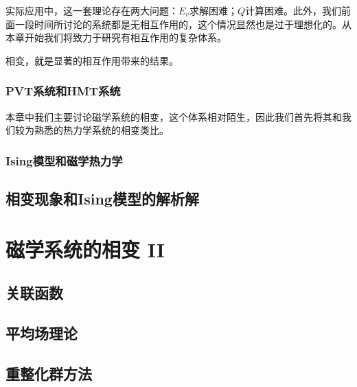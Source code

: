 \documentclass[AutoFakeBold]{tstextbook}
\begin{document}
实际应用中，这一套理论存在两大问题：$E_v$求解困难；$Q$计算困难。此外，我们前面一段时间所讨论的系统都是无相互作用的，这个情况显然也是过于理想化的。从本章开始我们将致力于研究有相互作用的复杂体系。

相变，就是显著的相互作用带来的结果。

\subsection{PVT系统和HMT系统} %
\label{sub:PVT系统和HMT系统}
本章中我们主要讨论磁学系统的相变，这个体系相对陌生，因此我们首先将其和我们较为熟悉的热力学系统的相变类比。
\subsection{Ising模型和磁学热力学} %
\label{sub:Ising模型和磁学热力学}


\section{相变现象和Ising模型的解析解} %
\label{sec:相变现象和Ising模型的解析解}


\chapter{磁学系统的相变 II} %
\label{cha:磁学系统的相变 II}
\section{关联函数} %
\label{sec:关联函数}

\section{平均场理论} %
\label{sec:平均场理论}

\section{重整化群方法} %
\label{sec:重整化群方法}

\end{document}
